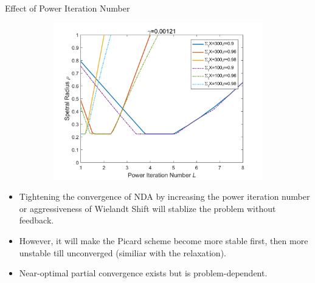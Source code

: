 \begin{frame}{Effect of Power Iteration Number}
\begin{figure}
\begin{subfigure}[t]{0.4\textwidth}
		\includegraphics[width=\textwidth]{Texfile/Figure/Feedback_n.png}
	\end{subfigure}
\end{figure} 
\vspace{-1.5em}
\begin{itemize}
    \item Tightening the convergence of NDA by increasing the power iteration number or aggressiveness of Wielandt Shift will stablize the problem without feedback.
    \vspace{-0.7em}
    \item However, it will make the Picard scheme become more stable first, then more unstable till unconverged (similiar with the relaxation).
    \vspace{-0.7em}
    \item Near-optimal partial convergence exists but is problem-dependent.
\end{itemize}   
\end{frame}
